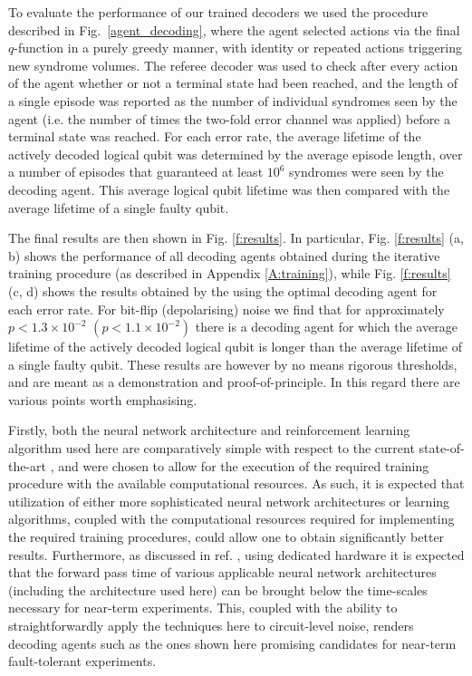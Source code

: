 \documentclass[twocolumn,preprintnumbers,amsmath,amssymb,notitlepage,nofootinbib,longbibliography,superscriptaddress,aps,pra,10pt]{revtex4-1}
\begin{document}
	To evaluate the performance of our trained decoders we used the procedure described in Fig.~\ref{agent_decoding}, where the agent selected actions via the final $q$-function in a purely greedy manner, with identity or repeated actions triggering new syndrome volumes.
	The referee decoder was used to check after every action of the agent whether or not a terminal state had been reached, and the length of a single episode was reported as the number of individual syndromes seen by the agent (i.e. the number of times the two-fold error channel was applied) before a terminal state was reached.
	For each error rate, the average lifetime of the actively decoded logical qubit was determined by the average episode length, over a number of episodes that guaranteed at least $10^6$ syndromes were seen by the decoding agent.
	This average logical qubit lifetime was then compared with the average lifetime of a single faulty qubit.

	The final results are then shown in Fig. \ref{f:results}.
	In particular, Fig. \ref{f:results} (a, b) shows the performance of all decoding agents obtained during the iterative training procedure (as described in Appendix \ref{A:training}), while Fig. \ref{f:results} (c, d) shows the results obtained by the using the optimal decoding agent for each error rate.
	For bit-flip (depolarising) noise we find that for approximately $p < 1.3\times 10^{-2}$  $(p < 1.1\times 10^{-2})$ there is a decoding agent for which the average lifetime of the actively decoded logical qubit is longer than the average lifetime of a single faulty qubit.
	These results are however by no means rigorous thresholds, and are meant as a demonstration and proof-of-principle. 
	In this regard there are various points worth emphasising.

	Firstly, both the neural network architecture and reinforcement learning algorithm used here are comparatively simple with respect to the current state-of-the-art \cite{RLmnih2016asynchronous,RLSilver17b,RLsilver2017mastering,RLSilver2016}, and were chosen to allow for the execution of the required training procedure with the available computational resources.
	As such, it is expected that utilization of either more sophisticated neural network architectures or learning algorithms, coupled with the computational resources required for implementing the required training procedures, could allow one to obtain significantly better results.
	Furthermore, as discussed in ref. \cite{chamberland2018deep}, using dedicated hardware it is expected that the forward pass time of various applicable neural network architectures (including the architecture used here) can be brought below the time-scales necessary for near-term experiments. 
	This, coupled with the ability to straightforwardly apply the techniques here to circuit-level noise, renders decoding agents such as the ones shown here promising candidates for near-term fault-tolerant experiments.
\end{document}
